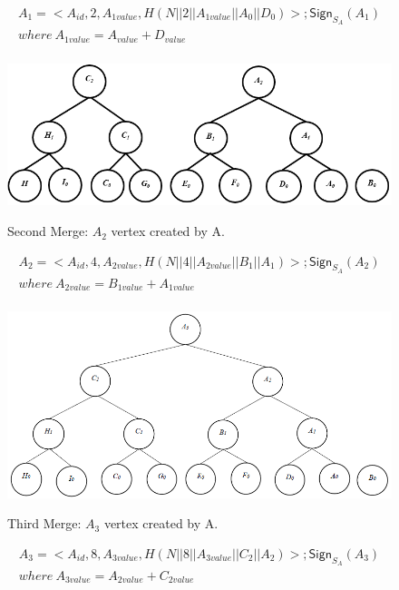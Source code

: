 \begin{exmp}
				\begin{equation}
					\begin{array}{l}
				A_{1} = <A_{id}, 2, A_{1value}, H(N||2||A_{1value}||A_{0}||D_{0})>; \textsf{Sign}_{S_{A}}(A_{1})\\
				where\  A_{1value} = A_{value} + D_{value} \\
					\end{array}	
				\end{equation}
				\begin{figure}[h!]
					\centering
					\includegraphics[width=\textwidth]{images/commitment-tree-example-3.png}\\
					\caption{Second Merge: $A_{2}$ vertex created by A.}
					\label{fig:commitment-tree-example-3}
				\end{figure}
				\begin{equation}
					\begin{array}{l}
						A_{2} = <A_{id}, 4, A_{2value}, H(N||4||A_{2value}||B_{1}||A_{1}) >; \textsf{Sign}_{S_{A}}(A_{2})\\
						where\  A_{2value} = B_{1value} + A_{1value} \\
					\end{array}
				\end{equation}
				\begin{figure}[h!]
					\centering
					\includegraphics[width=6in]{images/commitment-tree-example-4.png}\\
					\caption{Third Merge: $A_{3}$ vertex created by A.}
					\label{fig:commitment-tree-example-4}
				\end{figure}
				\begin{equation}
					\begin{array}{l}
						A_{3} = <A_{id},8, A_{3value},H(N||8||A_{3value}||C_{2}||A_{2})>; \textsf{Sign}_{S_{A}}(A_{3})\\
						where\ A_{3value} = A_{2value} + C_{2value}
					\end{array}
				\end{equation}
			\end{exmp}

